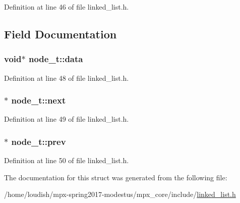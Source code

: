 Definition at line 46 of file linked\+\_\+list.\+h.



\subsection{Field Documentation}
\subsubsection[{\texorpdfstring{data}{data}}]{\setlength{\rightskip}{0pt plus 5cm}void$\ast$ node\+\_\+t\+::data}\hypertarget{structs__ll__node_aa69340d9d81a183ddfbfec74a7524966}{}\label{structs__ll__node_aa69340d9d81a183ddfbfec74a7524966}


Definition at line 48 of file linked\+\_\+list.\+h.

\subsubsection[{\texorpdfstring{next}{next}}]{$\ast$ node\+\_\+t\+::next}\hypertarget{structs__ll__node_a3eaaa938f4adef906b28c0afcaf511d6}{}\label{structs__ll__node_a3eaaa938f4adef906b28c0afcaf511d6}


Definition at line 49 of file linked\+\_\+list.\+h.

\subsubsection[{\texorpdfstring{prev}{prev}}]{$\ast$ node\+\_\+t\+::prev}\hypertarget{structs__ll__node_a19e812d499f3cd75491d7ab5b1d08e6c}{}\label{structs__ll__node_a19e812d499f3cd75491d7ab5b1d08e6c}


Definition at line 50 of file linked\+\_\+list.\+h.



The documentation for this struct was generated from the following file\+:\begin{DoxyCompactItemize}
\item 
/home/loudish/mpx-\/spring2017-\/modestus/mpx\+\_\+core/include/\hyperlink{linked__list_8h}{linked\+\_\+list.\+h}\end{DoxyCompactItemize}
